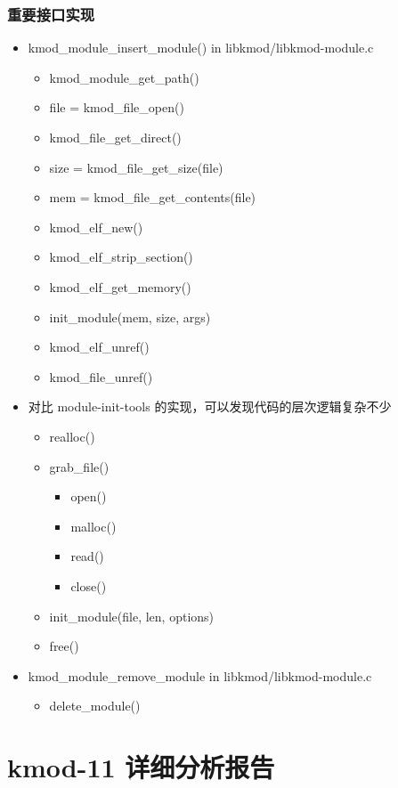 \documentclass[11pt,a4paper]{article}
\begin{document}
\subsubsection{重要接口实现}

\begin{itemize}
\item
  kmod\_module\_insert\_module() in libkmod/libkmod-module.c
  \begin{itemize}
  \item
    kmod\_module\_get\_path()
  \item
    file = kmod\_file\_open()
  \item
    kmod\_file\_get\_direct()
  \item
    size = kmod\_file\_get\_size(file)
  \item
    mem = kmod\_file\_get\_contents(file)
  \item
    kmod\_elf\_new()
  \item
    kmod\_elf\_strip\_section()
  \item
    kmod\_elf\_get\_memory()
  \item
    init\_module(mem, size, args)
  \item
    kmod\_elf\_unref()
  \item
    kmod\_file\_unref()
  \end{itemize}
\item
  对比 module-init-tools 的实现，可以发现代码的层次逻辑复杂不少
  \begin{itemize}
  \item
    realloc()
  \item
    grab\_file()
    \begin{itemize}
    \item
      open()
    \item
      malloc()
    \item
      read()
    \item
      close()
    \end{itemize}
  \item
    init\_module(file, len, options)
  \item
    free()
  \end{itemize}
\item
  kmod\_module\_remove\_module in libkmod/libkmod-module.c
  \begin{itemize}
  \item
    delete\_module()
  \end{itemize}
\end{itemize}
\section{kmod-11 详细分析报告}
\end{document}
